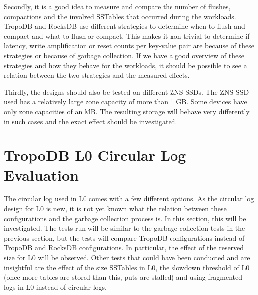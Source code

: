 Secondly, it is a good idea to measure and compare the number of flushes, compactions and the involved SSTables that occurred during the workloads. TropoDB and RocksDB use different strategies to determine when to flush and compact and what to flush or compact. This makes it non-trivial to determine if latency, write amplification or reset counts per key-value pair are because of these strategies or because of garbage collection. If we have a good overview of these strategies and how they behave for the workloads, it should be possible to see a relation between the two strategies and the measured effects.

Thirdly, the designs should also be tested on different ZNS SSDs. The ZNS SSD used has a relatively large zone capacity of more than 1 GB. Some devices have only zone capacities of an MB. The resulting storage will behave very differently in such cases and the exact effect should be investigated. 

\section{TropoDB L0 Circular Log Evaluation}
\label{sec:evalL02}
The circular log used in L0 comes with a few different options. As the circular log design for L0 is new, it is not yet known what the relation between these configurations and the garbage collection process is. In this section, this will be investigated. The tests run will be similar to the garbage collection tests in the previous section, but the tests will compare TropoDB configurations instead of TropoDB and RocksDB configurations. In particular, the effect of the reserved size for L0 will be observed. Other tests that could have been conducted and are insightful are the effect of the size SSTables in L0, the slowdown threshold of L0 (once more tables are stored than this, puts are stalled) and using fragmented logs in L0 instead of circular logs. 

